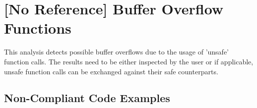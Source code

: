 \section{[No Reference] Buffer Overflow Functions}

This analysis detects possible buffer overflows due to the usage of 
'unsafe' function calls. The results need to be either inspected by the user
or if applicable, unsafe function calls can be exchanged against their
safe counterparts.



\subsection{Non-Compliant Code Examples}
